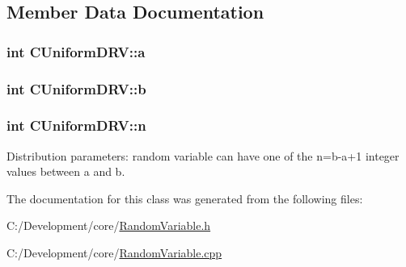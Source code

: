 \subsection{Member Data Documentation}
\hypertarget{class_c_uniform_d_r_v_a27e69eec5f473918bb39e5878a9b8983}{
\subsubsection[{a}]{\setlength{\rightskip}{0pt plus 5cm}int C\-Uniform\-D\-R\-V\-::a\hspace{0.3cm}{\ttfamily [private]}}}\label{class_c_uniform_d_r_v_a27e69eec5f473918bb39e5878a9b8983}
\hypertarget{class_c_uniform_d_r_v_a67e7c41484fd23c788b612af61797992}{
\subsubsection[{b}]{\setlength{\rightskip}{0pt plus 5cm}int C\-Uniform\-D\-R\-V\-::b\hspace{0.3cm}{\ttfamily [private]}}}\label{class_c_uniform_d_r_v_a67e7c41484fd23c788b612af61797992}
\hypertarget{class_c_uniform_d_r_v_a9a5ada91bbce53c6b3eb01179eae1537}{
\subsubsection[{n}]{\setlength{\rightskip}{0pt plus 5cm}int C\-Uniform\-D\-R\-V\-::n\hspace{0.3cm}{\ttfamily [private]}}}\label{class_c_uniform_d_r_v_a9a5ada91bbce53c6b3eb01179eae1537}
Distribution parameters\-: random variable can have one of the n=b-\/a+1 integer values between a and b. 

The documentation for this class was generated from the following files\-:\begin{DoxyCompactItemize}
\item 
C\-:/\-Development/core/\hyperlink{_random_variable_8h}{Random\-Variable.\-h}\item 
C\-:/\-Development/core/\hyperlink{_random_variable_8cpp}{Random\-Variable.\-cpp}\end{DoxyCompactItemize}
